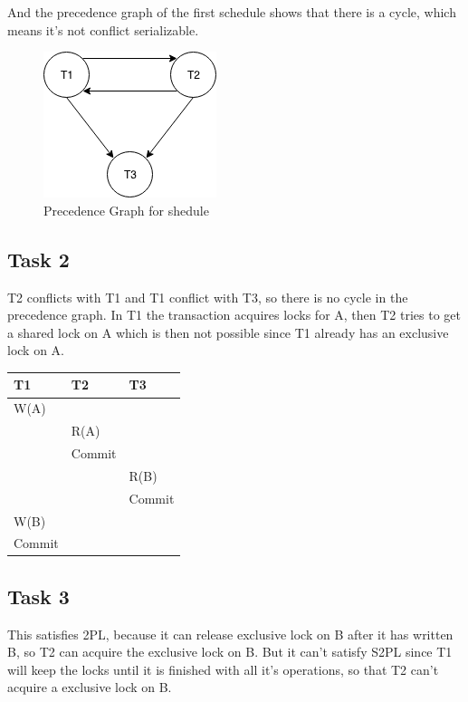 \documentclass[12pt,a4paper]{article}
\begin{document}
And the precedence graph of the first schedule shows that there is a cycle, which means it's not conflict serializable.
\begin{figure}
	\center
	\includegraphics{img/Q1-task1}
	\caption{Precedence Graph for shedule}
\end{figure}

\subsection{Task 2}
T2 conflicts with T1 and T1 conflict with T3, so there is no cycle in the precedence graph.
In T1 the transaction acquires locks for A, then T2 tries to get a shared lock on A which is then not possible since T1 already has an exclusive lock on A.
\begin{table}[!htbp]
    \centering
    \begin{tabularx}{\textwidth}{l|l|l}
        \hline
        T1 & T2 & T3 \\ 
        \hline
        W(A)   &  	    &   			\\
        	   & R(A)   & 			\\
         	   & Commit & 			\\        
               &        &  R(B) 		\\
               &		&  Commit	\\
        W(B)   & 		& 			\\
        Commit & 		& 			\\     
        \hline
    \end{tabularx}
\end{table}

\subsection{Task 3}
This satisfies 2PL, because it can release exclusive lock on B after it has written B, so T2 can acquire the exclusive lock on B.
But it can't satisfy S2PL since T1 will keep the locks until it is finished with all it's operations, so that T2 can't acquire a exclusive lock on B.
\end{document}
